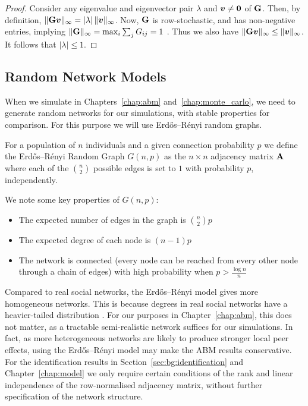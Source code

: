 \begin{proof}
Consider any eigenvalue and eigenvector pair $\lambda$ and $\bm{v} \neq \bm{0}$ of $\mathbf{G}$. Then, by definition, $\|\mathbf{G}\bm{v}\|_\infty = |\lambda|\,\|\bm{v}\|_\infty$. Now, $\mathbf{G}$ is row-stochastic, and has non-negative entries, implying $\|\mathbf{G}\|_\infty = \max_i \sum_j G_{ij} = 1$ \parencite[Eq.~(2.3.10), p.~72]{GolubVanLoan2013}. Thus we also have $\|\mathbf{G}\bm{v}\|_\infty \leq \|\bm{v}\|_\infty$. It follows that $|\lambda| \leq 1$.
\end{proof}


\subsection{Random Network Models}

When we simulate in Chapters~\ref{chap:abm} and~\ref{chap:monte_carlo}, we need to generate random networks for our simulations, with stable properties for comparison. For this purpose we will use Erd\H{o}s--R\'enyi random graphs.

\begin{definition}
For a population of $n$ individuals and a given connection probability $p$ we define the Erd\H{o}s--R\'enyi Random Graph $G(n, p)$ as the $n \times n$ adjacency matrix $\mathbf{A}$ where each of the $\binom{n}{2}$ possible edges is set to $1$ with probability $p$, independently.
\end{definition}

We note some key properties of $G(n, p)$:
\begin{itemize}
    \item The expected number of edges in the graph is $\binom{n}{2} p$
    \item The expected degree of each node is $(n-1)p$
    \item The network is connected (every node can be reached from every other node through a chain of edges) with high probability when $p > \frac{\log n}{n}$
\end{itemize}

Compared to real social networks, the Erd\H{o}s--R\'enyi model gives more homogeneous networks. This is because degrees in real social networks have a heavier-tailed distribution \parencite[p.~510]{BarabasiAlbert1999}. For our purposes in Chapter~\ref{chap:abm}, this does not matter, as a tractable semi-realistic network suffices for our simulations. In fact, as more heterogeneous networks are likely to produce stronger local peer effects, using the Erd\H{o}s--R\'enyi model may make the ABM results conservative. For the identification results in Section~\ref{sec:bg:identification} and Chapter~\ref{chap:model} we only require certain conditions of the rank and linear independence of the row-normalised adjacency matrix, without further specification of the network structure.

